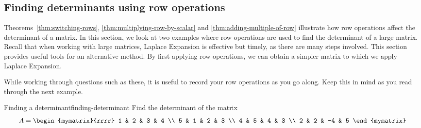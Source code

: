\subsection{Finding determinants using row operations}

Theorems~\ref{thm:switching-rows}, {\ref{thm:multiplying-row-by-scalar}} and {\ref{thm:adding-multiple-of-row}} illustrate 
how row operations affect the determinant of a matrix. In this section, we look at two examples where row operations are 
used to find the determinant of a large matrix. Recall that when working with large matrices, Laplace Expansion
is effective but timely, as there are many steps involved. This section provides useful tools for
an alternative method. By first applying row operations, we can obtain a simpler matrix to which we apply Laplace Expansion. 

While working through questions such as these, it is useful to record your row operations as you go along. Keep this in mind
as you read through the next example. 

\begin{example}{Finding a determinant}{finding-determinant}
Find the determinant of the matrix
\begin{equation*}
A=\begin{mymatrix}{rrrr}
1 & 2 & 3 & 4 \\
5 & 1 & 2 & 3 \\
4 & 5 & 4 & 3 \\
2 & 2 & -4 & 5
\end{mymatrix}
\end{equation*}
\end{example}

